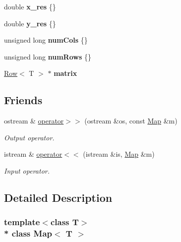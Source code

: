 \begin{DoxyCompactItemize}
\item 
double {\bfseries x\+\_\+res} \{\}\hypertarget{class_map_ad385ffe20fb2ae2dc5fa1c6edf72649f}{}\label{class_map_ad385ffe20fb2ae2dc5fa1c6edf72649f}

\item 
double {\bfseries y\+\_\+res} \{\}\hypertarget{class_map_aea5d0fe583fdc11aa94fb5eae6766644}{}\label{class_map_aea5d0fe583fdc11aa94fb5eae6766644}

\item 
unsigned long {\bfseries num\+Cols} \{\}\hypertarget{class_matrix_a341aaedcfaac978957087bd0467dc527}{}\label{class_matrix_a341aaedcfaac978957087bd0467dc527}

\item 
unsigned long {\bfseries num\+Rows} \{\}\hypertarget{class_matrix_ac1e96667d48c7845708f978ddd17475d}{}\label{class_matrix_ac1e96667d48c7845708f978ddd17475d}

\item 
\hyperlink{class_row}{Row}$<$ T $>$ $\ast$ {\bfseries matrix}\hypertarget{class_matrix_a7a143ae112112155c9622ba17dc434c7}{}\label{class_matrix_a7a143ae112112155c9622ba17dc434c7}

\end{DoxyCompactItemize}
\subsection*{Friends}
\begin{DoxyCompactItemize}
\item 
ostream \& \hyperlink{class_map_a5f8b100f4f0ca3215429cc9c46cdd90a}{operator$>$$>$} (ostream \&os, const \hyperlink{class_map}{Map} \&m)
\begin{DoxyCompactList}\small\item\em Output operator. \end{DoxyCompactList}\item 
istream \& \hyperlink{class_map_a2cb87ce0bbf263326a632b9537725d96}{operator$<$$<$} (istream \&is, \hyperlink{class_map}{Map} \&m)
\begin{DoxyCompactList}\small\item\em Input operator. \end{DoxyCompactList}\end{DoxyCompactItemize}


\subsection{Detailed Description}
\subsubsection*{template$<$class T$>$\\*
class Map$<$ T $>$}

